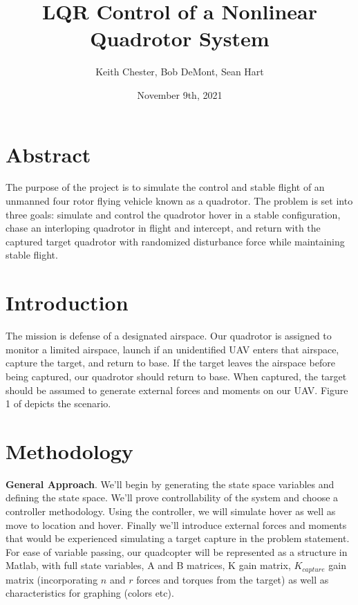 \documentclass{article}
\title{LQR Control of a Nonlinear Quadrotor System}
\author{Keith Chester, Bob DeMont, Sean Hart}
\date{November 9th, 2021}
\begin{document}
\maketitle

\begin{multicols}{2}
\section*{Abstract}
The purpose of the project is to simulate the control and stable flight of an unmanned four rotor flying vehicle known as a quadrotor.  The problem is set into three goals: simulate and control the quadrotor hover in a stable configuration, chase an interloping quadrotor in flight and intercept, and return with the captured target quadrotor with randomized disturbance force while maintaining stable flight.

\section*{Introduction}
The mission is defense of a designated airspace.  Our quadrotor is assigned to monitor a limited airspace, launch if an unidentified 
UAV enters that airspace, capture the target, and return to base.  If the target leaves the airspace before being captured, our 
quadrotor should return to base.  When captured, the target should be assumed to generate external forces and moments on our UAV.  Figure 1 of \cite{FaalP} depicts the scenario.
\section*{Methodology}
\textbf{General Approach}. We'll begin by generating the state space variables and defining the state space.  We'll prove 
controllability of the system and choose a controller methodology.  Using the controller, we will simulate hover as well as move to 
location and hover.  Finally we'll introduce external forces and moments that would be experienced simulating a target capture in the 
problem statement.  For ease of variable passing, our quadcopter will be represented as a structure in Matlab, with full state 
variables, A and B matrices, K gain matrix, $K_{capture}$ gain matrix (incorporating $n$ and $r$ forces and torques from the target) 
as well as characteristics for graphing (colors etc).\\


\end{multicols}
\end{document}
